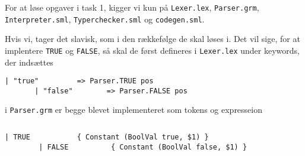\documentclass[11pt,a4paper,oneside]{report}
\begin{document}

\setcounter{page}{0}
\renewcommand\thepage{\roman{page}}



\tableofcontents

\newpage

\setcounter{page}{1}
\renewcommand\thepage{\arabic{page}}


For at løse opgaver i task 1, kigger vi kun på \texttt{Lexer.lex}, \texttt{Parser.grm}, \texttt{Interpreter.sml}, \texttt{Typerchecker.sml} og \texttt{codegen.sml}.

Hvis vi, tager det slavisk, som i den rækkefølge de skal løses i. Det vil sige, for at implentere \texttt{TRUE} og \texttt{FALSE}, så skal de først defineres i \texttt{Lexer.lex} under keywords, der indsættes
\begin{lstlisting}[firstnumber=42]
       | "true"         => Parser.TRUE pos
       | "false"        => Parser.FALSE pos
\end{lstlisting}
i \texttt{Parser.grm} er begge blevet implementeret som tokens og expresseion
\begin{lstlisting}[firstnumber=13]
%token <(int*int)> TRUE FALSE
\end{lstlisting}
\begin{lstlisting}[mathescape=false,firstnumber=68]
        | TRUE           { Constant (BoolVal true, $1) }
        | FALSE          { Constant (BoolVal false, $1) }
\end{lstlisting}






\clearpage
{}


\end{document}
